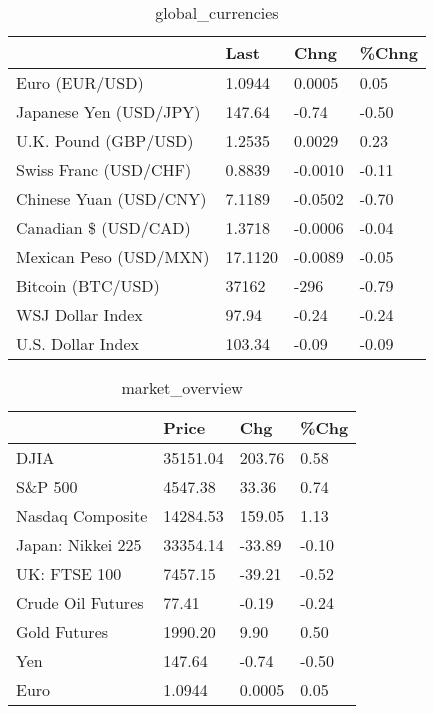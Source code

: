 \documentclass{article}%
\begin{document}
%


\begin{table}[htbp]%
\caption{global\_currencies}%
\centering%
\begin{adjustbox}{width=1\textwidth}%
\begin{tabular}{llll}
\toprule
                       &    Last &    Chng & \%Chng \\
\midrule
        Euro (EUR/USD) &  1.0944 &  0.0005 &  0.05 \\
Japanese Yen (USD/JPY) &  147.64 &   -0.74 & -0.50 \\
  U.K. Pound (GBP/USD) &  1.2535 &  0.0029 &  0.23 \\
 Swiss Franc (USD/CHF) &  0.8839 & -0.0010 & -0.11 \\
Chinese Yuan (USD/CNY) &  7.1189 & -0.0502 & -0.70 \\
  Canadian \$ (USD/CAD) &  1.3718 & -0.0006 & -0.04 \\
Mexican Peso (USD/MXN) & 17.1120 & -0.0089 & -0.05 \\
     Bitcoin (BTC/USD) &   37162 &    -296 & -0.79 \\
      WSJ Dollar Index &   97.94 &   -0.24 & -0.24 \\
     U.S. Dollar Index &  103.34 &   -0.09 & -0.09 \\
\bottomrule
\end{tabular}
%
\end{adjustbox}%
\end{table}

%


\begin{table}[htbp]%
\caption{market\_overview}%
\centering%
\begin{adjustbox}{width=1\textwidth}%
\begin{tabular}{llll}
\toprule
                  &    Price &    Chg &  \%Chg \\
\midrule
             DJIA & 35151.04 & 203.76 &  0.58 \\
          S\&P 500 &  4547.38 &  33.36 &  0.74 \\
 Nasdaq Composite & 14284.53 & 159.05 &  1.13 \\
Japan: Nikkei 225 & 33354.14 & -33.89 & -0.10 \\
     UK: FTSE 100 &  7457.15 & -39.21 & -0.52 \\
Crude Oil Futures &    77.41 &  -0.19 & -0.24 \\
     Gold Futures &  1990.20 &   9.90 &  0.50 \\
              Yen &   147.64 &  -0.74 & -0.50 \\
             Euro &   1.0944 & 0.0005 &  0.05 \\
\bottomrule
\end{tabular}
%
\end{adjustbox}%
\end{table}

%
\end{document}

